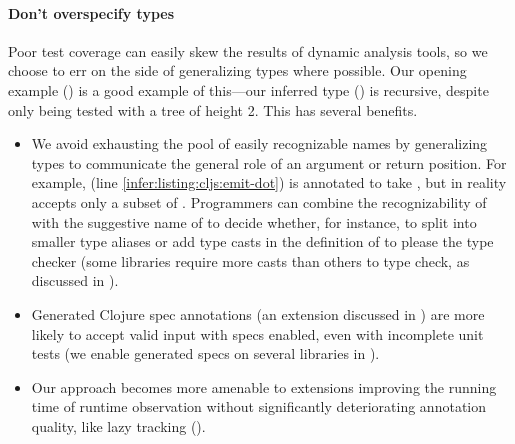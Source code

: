 
\paragraph{Don't overspecify types}
Poor test coverage can easily skew the results of dynamic analysis tools,
so we choose to err on the side of generalizing types
where possible.
Our opening example  ()
is a good example of this---our inferred type ()
is recursive, despite  only being tested with a tree of height 2.
This has several benefits.
\begin{itemize}
  \item We avoid exhausting the pool of easily recognizable names
    by generalizing types to communicate the general role
    of an argument or return position.
    For example,  (line \ref{infer:listing:cljs:emit-dot})
    is annotated to take , but in reality accepts only a subset
    of .
    Programmers can combine the recognizability of  with the
    suggestive name of  to decide whether, for instance,
    to split  into smaller type aliases
    or add type casts in the definition of  to please 
    the type checker
    (some libraries require more casts than others to type check, as discussed in ).
  \item Generated Clojure spec annotations (an extension discussed in )
        are more likely to accept valid input with specs enabled, even with incomplete unit tests
        (we enable generated specs on several libraries in ).
  \item Our approach becomes more amenable to extensions improving the running time
        of runtime observation without significantly deteriorating annotation quality,
        like lazy tracking ().
\end{itemize}

